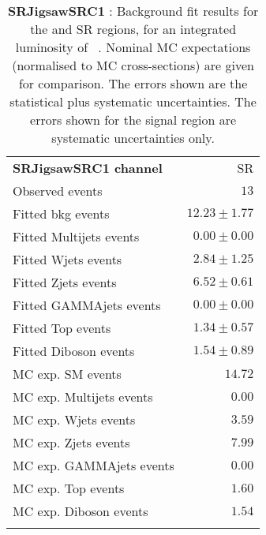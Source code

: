 

\begin{table}
\begin{center}
\setlength{\tabcolsep}{0.0pc}
{\tiny
\begin{tabular*}{\textwidth}{@{\extracolsep{\fill}}lr}
\noalign{\smallskip}\hline\noalign{\smallskip}
{\bf SRJigsawSRC1 channel}           & SR              \\[-0.05cm]
\noalign{\smallskip}\hline\noalign{\smallskip}
Observed events          & $13$                    \\
\noalign{\smallskip}\hline\noalign{\smallskip}
Fitted bkg events         & $12.23 \pm 1.77$              \\
\noalign{\smallskip}\hline\noalign{\smallskip}
        Fitted Multijets events         & $0.00 \pm 0.00$              \\
        Fitted Wjets events         & $2.84 \pm 1.25$              \\
        Fitted Zjets events         & $6.52 \pm 0.61$              \\
        Fitted GAMMAjets events         & $0.00 \pm 0.00$              \\
        Fitted Top events         & $1.34 \pm 0.57$              \\
        Fitted Diboson events         & $1.54 \pm 0.89$              \\
 \noalign{\smallskip}\hline\noalign{\smallskip}
MC exp. SM events              & $14.72$              \\
\noalign{\smallskip}\hline\noalign{\smallskip}
        MC exp. Multijets events         & $0.00$              \\
        MC exp. Wjets events         & $3.59$              \\
        MC exp. Zjets events         & $7.99$              \\
        MC exp. GAMMAjets events         & $0.00$              \\
        MC exp. Top events         & $1.60$              \\
        MC exp. Diboson events         & $1.54$              \\
\noalign{\smallskip}\hline\noalign{\smallskip}
\end{tabular*}
}
\end{center}
\caption{{\bf SRJigsawSRC1} : Background fit results for the  and SR regions, for an integrated luminosity of \ourintlumi~\ifb. Nominal MC expectations (normalised to MC cross-sections) are given for comparison. The errors shown are the statistical plus systematic uncertainties. The errors shown for the signal region are systematic uncertainties only.}
\label{table.results.systematics.in.logL.fit.SR.SRJigsawSRC1}
\end{table}
%